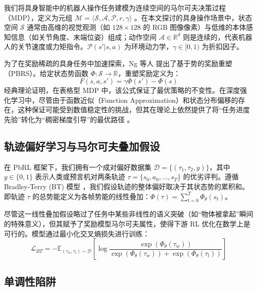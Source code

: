 我们将具身智能中的机器人操作任务建模为连续空间的马尔可夫决策过程（MDP），定义为元组 $\mathcal{M} = \langle \mathcal{S}, \mathcal{A}, \mathcal{P}, r, \gamma \rangle$ \cite{sutton2018}。在本文探讨的具身操作场景中，状态空间 $\mathcal{S}$ 通常由高维的视觉观测（如 $128 \times 128$ 的 RGB 图像像素）与低维的本体感知信息（如关节角度、末端位姿）组成；动作空间 $\mathcal{A} \in \mathbb{R}^d$ 则是连续的，代表机器人的关节速度或力矩指令。$\mathcal{P}(s'|s,a)$ 为环境动力学，$\gamma \in [0, 1)$ 为折扣因子。

为了在奖励稀疏的具身任务中加速探索，Ng 等人 \cite{ng1999policy} 提出了基于势的奖励重塑（PBRS）。给定状态势函数 $\Phi: \mathcal{S} \to \mathbb{R}$，重塑奖励定义为：
\begin{equation}
\label{eq:pbrs}
    F(s, a, s') = \gamma \Phi(s') - \Phi(s)
\end{equation}
经典理论证明，在表格型 MDP 中，该公式保证了最优策略的不变性。在深度强化学习中，尽管由于函数近似（Function Approximation）和状态分布偏移的存在，这种保证可能受到数值稳定性的挑战，但其在理论上依然提供了将“任务进度先验”转化为“稠密梯度引导”的最优路径 \cite{muller2025improving}。

\subsection{轨迹偏好学习与马尔可夫叠加假设}

在 PbRL 框架下，我们拥有一个成对偏好数据集 $\mathcal{D} = \{(\tau_1, \tau_2, y)\}$，其中 $y \in \{0, 1\}$ 表示人类或预言机对两条轨迹 $\tau = \{s_0, a_0, \dots, s_T\}$ 的优劣评判。遵循 Bradley-Terry (BT) 模型 \cite{bradley1952, christiano2017deep}，我们假设轨迹的整体偏好取决于其状态势的累积和。即轨迹 $\tau$ 的总势能定义为各帧势能的线性叠加：$\Phi(\tau) = \sum_{t=0}^T \Phi_\theta(s_t)$。

尽管这一线性叠加假设略过了任务中某些非线性的语义突破（如“物体被拿起”瞬间的特殊意义），但其赋予了奖励模型马尔可夫属性，使得下游 RL 优化在数学上是可行的。模型通过最小化交叉熵损失进行训练：
\begin{equation}
\label{eq:bt}
    \mathcal{L}_{BT} = - \mathbb{E}_{(\tau_w, \tau_l) \sim \mathcal{D}} \left[ \log \frac{\exp(\Phi_\theta(\tau_w))}{\exp(\Phi_\theta(\tau_w)) + \exp(\Phi_\theta(\tau_l))} \right]
\end{equation}

\subsection{单调性陷阱}

